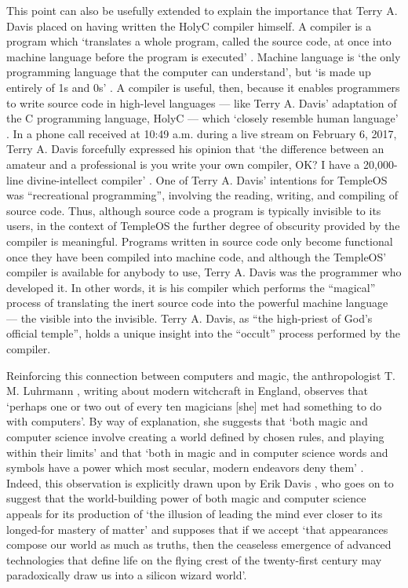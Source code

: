 This point can also be usefully extended to explain
the importance that Terry A. Davis placed
on having written the HolyC compiler himself.
A compiler is a program which `translates a whole program, called the
source code, at once into machine language before the program is executed'
\parencite[323]{Computers}.
Machine language is `the only programming language that the computer can
understand', but `is made up entirely of 1s and 0s'
\parencite[321]{Computers}.
A compiler is useful, then, because it enables programmers to write
source code in high-level languages --- like Terry A. Davis' adaptation of the C
programming language, HolyC --- which `closely resemble human language'
\parencite[323]{Computers}.
In a phone call received at 10:49 a.m. during a live stream
on February 6, 2017, Terry A. Davis  forcefully expressed his opinion that
`the difference between an amateur and a professional is you write your
own compiler, OK? I have a 20,000-line divine-intellect compiler'
\parencite[31:44]{Telephone}.
One of Terry A. Davis' intentions for TempleOS was
``recreational programming'', involving the reading, writing,
and compiling of source code.
Thus, although source code a program is typically invisible to its users,
in the context of TempleOS the further degree of obscurity
provided by the compiler is meaningful.
Programs written in source code only become functional
once they have been compiled into machine code, and although the TempleOS'
compiler is available for anybody to use, Terry A. Davis was the programmer
who developed it.
In other words, it is his compiler which performs the ``magical'' process
of translating the inert source code into the powerful
machine language --- the visible into the invisible.
Terry A. Davis, as ``the high-priest of God's official temple'',
holds a unique insight into the ``occult'' process performed by the compiler.

Reinforcing this connection between computers and magic,
the anthropologist T. M. Luhrmann \parencite*[106]{Luhrmann89},
writing about modern witchcraft in England, observes that
`perhaps one or two out of every ten magicians [she] met
had something to do with computers'.
By way of explanation, she suggests that `both magic and computer science
involve creating a world defined by chosen rules,
and playing within their limits' and that
`both in magic and in computer science words and symbols have a power which
most secular, modern endeavors deny them' \parencite[106]{Luhrmann89}.
Indeed, this observation is explicitly drawn upon by Erik Davis
\parencite*[181]{Davis98}, who goes on to suggest that the world-building
power of both magic and computer science appeals for its production of
`the illusion of leading the mind ever closer to its longed-for
mastery of matter' and supposes that if we accept
`that appearances compose our world as much as truths,
then the ceaseless emergence of advanced technologies that define life
on the flying crest of the twenty-first century may paradoxically draw us into
a silicon wizard world'.

